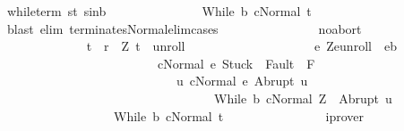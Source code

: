 \begin{isabellebody}
\ while{\isacharunderscore}term\ s{\isacharunderscore}t\ s{\isacharunderscore}in{\isacharunderscore}b\ \isanewline
\ \ \ \ \ \ \ \ \ \ \ \ \isamarkupfalse%
\ {\isachardoublequoteopen}{\isasymGamma}{\isasymturnstile}{\isacharparenleft}While\ b\ c{\isacharparenright}{\isasymdown}Normal\ t{\isachardoublequoteclose}\isanewline
\ \ \ \ \ \ \ \ \ \ \ \ \ \ \isamarkupfalse%
\ {\isacharparenleft}blast\ elim{\isacharcolon}\ terminates{\isacharunderscore}Normal{\isacharunderscore}elim{\isacharunderscore}cases{\isacharparenright}\isanewline
\ \ \ \ \ \ \ \ \ \ \ \ \isamarkupfalse%
\ \isamarkupfalse%
\ noabort\isanewline
\ \ \ \ \ \ \ \ \ \ \ \ \isamarkupfalse%
\ \isanewline
\ \ \ \ \ \ \ \ \ \ \ \ \isamarkupfalse%
\ {\isachardoublequoteopen}{\isacharparenleft}t{\isacharcomma}{\isasymsigma}{\isacharparenright}\ {\isasymin}\ {\isacharquery}r\ {\isasymand}\ {\isacharparenleft}Z{\isacharcomma}\ t{\isacharparenright}\ {\isasymin}\ {\isacharquery}unroll\ {\isasymand}\ \isanewline
\ \ \ \ \ \ \ \ \ \ \ \ \ \ \ \ \ \ {\isacharparenleft}{\isasymforall}e{\isachardot}\ {\isacharparenleft}Z{\isacharcomma}e{\isacharparenright}{\isasymin}{\isacharquery}unroll\ {\isasymlongrightarrow}\ e{\isasymin}b\isanewline
\ \ \ \ \ \ \ \ \ \ \ \ \ \ \ \ \ \ \ \ \ \ \ \ {\isasymlongrightarrow}\ {\isasymGamma}{\isasymturnstile}{\isasymlangle}c{\isacharcomma}Normal\ e{\isasymrangle}\ {\isasymRightarrow}{\isasymnotin}{\isacharparenleft}{\isacharbraceleft}Stuck{\isacharbraceright}\ {\isasymunion}\ Fault\ {\isacharbackquote}\ {\isacharparenleft}{\isacharminus}F{\isacharparenright}{\isacharparenright}\ {\isasymand}\ \isanewline
\ \ \ \ \ \ \ \ \ \ \ \ \ \ \ \ \ \ \ \ \ \ \ \ \ \ \ \ {\isacharparenleft}{\isasymforall}u{\isachardot}\ {\isasymGamma}{\isasymturnstile}{\isasymlangle}c{\isacharcomma}Normal\ e{\isasymrangle}\ {\isasymRightarrow}Abrupt\ u\ {\isasymlongrightarrow}\ \isanewline
\ \ \ \ \ \ \ \ \ \ \ \ \ \ \ \ \ \ \ \ \ \ \ \ \ \ \ \ \ \ \ \ \ \ {\isasymGamma}{\isasymturnstile}{\isasymlangle}While\ b\ c{\isacharcomma}Normal\ Z{\isasymrangle}\ {\isasymRightarrow}\ Abrupt\ u{\isacharparenright}{\isacharparenright}\ {\isasymand}\isanewline
\ \ \ \ \ \ \ \ \ \ \ \ \ \ \ \ \ \ {\isasymGamma}{\isasymturnstile}{\isacharparenleft}While\ b\ c{\isacharparenright}{\isasymdown}Normal\ t{\isachardoublequoteclose}\isanewline
\ \ \ \ \ \ \ \ \ \ \ \ \ \ \isamarkupfalse%
\ iprover\isanewline
\ \ \ \ \ \ \ \ \ \ \isacommand{{\isacharbraceright}}\isamarkupfalse%
\isanewline
\ \ \ \ \ \ \ \ \ \ \isamarkupfalse%

\end{isabellebody}
